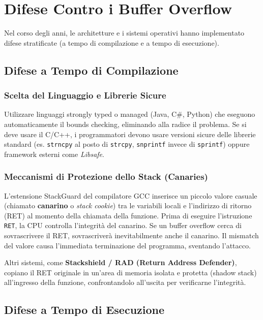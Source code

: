 \section{Difese Contro i Buffer Overflow}

Nel corso degli anni, le architetture e i sistemi operativi hanno implementato difese stratificate (a tempo di compilazione e a tempo di esecuzione).

\subsection{Difese a Tempo di Compilazione}

\subsubsection{Scelta del Linguaggio e Librerie Sicure}
Utilizzare linguaggi strongly typed o managed (Java, C\#, Python) che eseguono automaticamente il bounds checking, eliminando alla radice il problema. Se si deve usare il C/C++, i programmatori devono usare versioni sicure delle librerie standard (es. \texttt{strncpy} al posto di \texttt{strcpy}, \texttt{snprintf} invece di \texttt{sprintf}) oppure framework esterni come \textit{Libsafe}.

\subsubsection{Meccanismi di Protezione dello Stack (Canaries)}
\begin{warnbox}
L'estensione StackGuard del compilatore GCC inserisce un piccolo valore casuale (chiamato \textbf{canarino} o \textit{stack cookie}) tra le variabili locali e l'indirizzo di ritorno (RET) al momento della chiamata della funzione.
Prima di eseguire l'istruzione \texttt{RET}, la CPU controlla l'integrità del canarino. Se un buffer overflow cerca di sovrascrivere il RET, sovrascriverà inevitabilmente anche il canarino. Il mismatch del valore causa l'immediata terminazione del programma, sventando l'attacco.
\end{warnbox}
Altri sistemi, come \textbf{Stackshield / RAD (Return Address Defender)}, copiano il RET originale in un'area di memoria isolata e protetta (shadow stack) all'ingresso della funzione, confrontandolo all'uscita per verificarne l'integrità.

\subsection{Difese a Tempo di Esecuzione}
